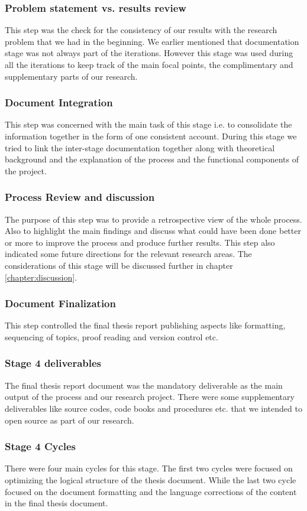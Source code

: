 \subsubsection{Problem statement vs. results review}\label{ps}
This step was the check for the consistency of our results with the research problem that we had in the beginning. We earlier mentioned that documentation stage was not always part of the iterations. However this stage was used during all the iterations to keep track of the main focal points, the complimentary and supplementary parts of our research.    
\subsubsection{Document Integration}
This step was concerned with the main task of this stage i.e. to consolidate the information together in the form of one consistent account. During this stage we tried to link the inter-stage documentation together along with theoretical background and the explanation of the process and the functional components of the project.
\subsubsection{Process Review and discussion}
The purpose of this step was to provide a retrospective view of the whole process. Also to highlight the main findings and discuss what could have been done better or more to improve the process and produce further results. This step also indicated some future directions for the relevant research areas. The considerations of this stage will be discussed further in chapter \ref{chapter:discussion}.
\subsubsection{Document Finalization}
This step controlled the final thesis report publishing aspects like formatting, sequencing of topics, proof reading and version control etc.  
\subsubsection{Stage 4 deliverables}
The final thesis report document was the mandatory deliverable  as the main output of the process and our research project. There were some supplementary deliverables like source codes, code books and procedures etc. that we intended to open source as part of our research.   
\subsubsection{Stage 4 Cycles}
There were four main cycles for this stage. The first two cycles were focused on optimizing the logical structure of the thesis document. While the last two cycle focused on the document formatting and the language corrections of the content in the final thesis document.   
